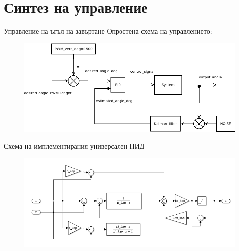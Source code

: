 \documentclass[handout]{beamer}
\begin{document}
\section{Синтез на управление}

\begin{frame}{Управление на ъгъл на завъртане}
	Опростена схема на управлението: 
	\begin{figure}[htpb!]
		\centering
		\includegraphics[width=1\textwidth]{Images/control_diagram_simple.png}
	\end{figure}
\end{frame}

\begin{frame}{Схема на имплементирания универсален ПИД}
	
	\begin{figure}[htpb!]
		\centering
		\includegraphics[width=1\textwidth]{Images/universal_pid.png}
	\end{figure}

\end{frame}
\end{document}
